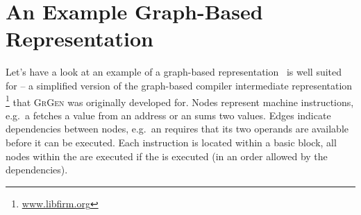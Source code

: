 \section{An Example Graph-Based Representation}\label{sub:examplegraphrep}
Let's have a look at an example of a graph-based representation \GrG\ is well suited for 
-- a simplified version of the graph-based compiler intermediate representation \Firm\footnote{\url{www.libfirm.org}} that \textsc{GrGen} was originally developed for.
Nodes represent machine instructions, e.g.\ a  fetches a value from an address or an  sums two values.
Edges indicate dependencies between nodes, e.g.\ an  requires that its two operands are available before it can be executed.
Each instruction is located within a basic block,
all nodes within the  are executed if the  is executed (in an order allowed by the dependencies).

